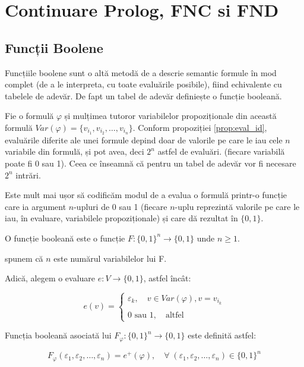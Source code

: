 \chapter{Continuare Prolog, FNC si FND}

\section{Funcții Boolene}

Funcțiile boolene sunt o altă metodă de a descrie semantic formule în mod complet (de a le interpreta, cu toate evaluările posibile),
fiind echivalente cu tabelele de adevăr. De fapt un tabel de adevăr definiește o funcție booleană.

Fie o formulă \( \varphi \) și mulțimea tutoror variabilelor propoziționale din această formulă \( Var(\varphi) =
\{v_{i_1}, v_{i_2}, \dots, v_{i_n} \}\). Conform propoziției \ref{prop:eval_id}, evaluările diferite ale unei
formule depind doar de valorile pe care le iau cele \( n \) variabile din formulă, și pot avea, deci \( 2^n \) astfel de evaluări. (fiecare
variabilă poate fi 0 sau 1). Ceea ce înseamnă că pentru un tabel de adevăr vor fi necesare \( 2^n \) intrări.

Este mult mai ușor să codificăm modul de a evalua o formulă printr-o funcție care ia argument \( n \)-upluri de 0 sau 1 (fiecare \( n \)-uplu
reprezintă valorile pe care le iau, în evaluare, variabilele propoziționale) și care dă rezultat în \( \{0, 1\} \).

\begin{definition}

	O funcție booleană este o funcție \( F : \{0, 1\}^n \to \{0, 1\} \) unde \( n \geq 1 \).

	\noindent spunem că \( n \) este numărul variabilelor lui F.
\end{definition}

Adică, alegem o evaluare \( e : V \to \{0, 1\}\), astfel încât:

\[
	e(v) = \begin{cases}
		\varepsilon_k, \quad v \in Var(\varphi), v = v_{i_k} \\ \\
		0 \text{ sau } 1, \quad \text{altfel}
	\end{cases}
\]

Funcția booleană asociată lui \( F_{\varphi} : \{0, 1\}^n \to \{0, 1\} \) este definită astfel:

\[
	F_\varphi(\varepsilon_1, \varepsilon_2, \dots, \varepsilon_n) = e^+(\varphi), \quad \forall \; (\varepsilon_1, \varepsilon_2, \dots, \varepsilon_n) \in \{0, 1\}^n
\]

